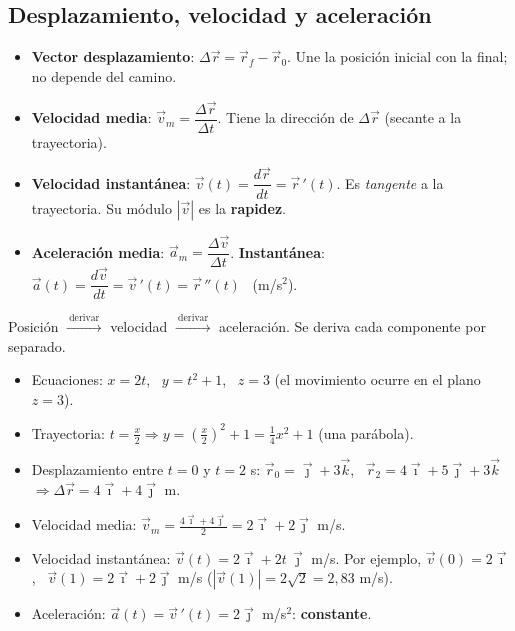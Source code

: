 \documentclass[11pt,a4paper]{article}
\newcommand{\ii}{\vec{\imath}}
\newcommand{\jj}{\vec{\jmath}}
\newcommand{\kk}{\vec{k}}
\begin{document}
\subsection{Desplazamiento, velocidad y aceleración}
\begin{itemize}[itemsep=3pt]
  \item \textbf{Vector desplazamiento}: $\Delta\vec r=\vec r_f-\vec r_0$. Une la posición inicial con la final; no depende del camino.
  \item \textbf{Velocidad media}: $\vec v_m=\dfrac{\Delta\vec r}{\Delta t}$. Tiene la dirección de $\Delta\vec r$ (secante a la trayectoria).
  \item \textbf{Velocidad instantánea}: $\vec v(t)=\dfrac{d\vec r}{dt}=\vec r\,'(t)$. Es \emph{tangente} a la trayectoria. Su módulo $|\vec v|$ es la \textbf{rapidez}.
  \item \textbf{Aceleración media}: $\vec a_m=\dfrac{\Delta\vec v}{\Delta t}$. \quad \textbf{Instantánea}: $\vec a(t)=\dfrac{d\vec v}{dt}=\vec v\,'(t)=\vec r\,''(t)$ \ (m/s$^2$).
\end{itemize}

\begin{clave}
Posición $\xrightarrow{\ \text{derivar}\ }$ velocidad $\xrightarrow{\ \text{derivar}\ }$ aceleración. Se deriva cada componente por separado.
\end{clave}

\begin{ejemplo}[title={Ejemplo: $\vec r(t)=2t\,\ii+(t^2+1)\,\jj+3\kk$ (m)}]
\begin{itemize}[itemsep=2pt]
  \item Ecuaciones: $x=2t$, \ $y=t^2+1$, \ $z=3$ (el movimiento ocurre en el plano $z=3$).
  \item Trayectoria: $t=\frac x2\Rightarrow y=\left(\frac x2\right)^2+1=\frac14x^2+1$ (una parábola).
  \item Desplazamiento entre $t=0$ y $t=2$ s: $\vec r_0=\jj+3\kk$, \ $\vec r_2=4\ii+5\jj+3\kk$ $\Rightarrow\Delta\vec r=4\ii+4\jj$ m.
  \item Velocidad media: $\vec v_m=\frac{4\ii+4\jj}{2}=2\ii+2\jj$ m/s.
  \item Velocidad instantánea: $\vec v(t)=2\ii+2t\,\jj$ m/s. Por ejemplo, $\vec v(0)=2\ii$, \ $\vec v(1)=2\ii+2\jj$ m/s ($|\vec v(1)|=2\sqrt2=2{,}83$ m/s).
  \item Aceleración: $\vec a(t)=\vec v\,'(t)=2\jj$ m/s$^2$: \textbf{constante}.
\end{itemize}
\end{ejemplo}
\end{document}
